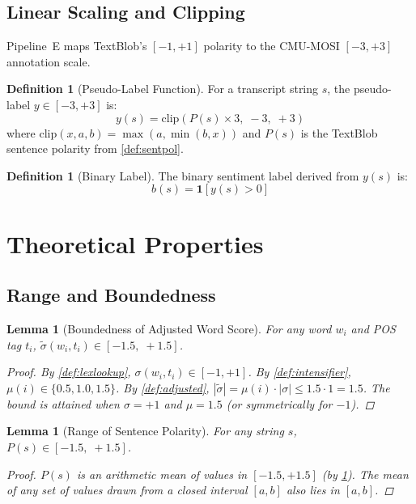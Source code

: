 \documentclass[12pt,a4paper]{article}
\theoremstyle{plain}
\newtheorem{lemma}[theorem]{Lemma}
\theoremstyle{definition}
\newtheorem{definition}[theorem]{Definition}
\begin{document}
\subsection{Linear Scaling and Clipping}

Pipeline~E maps TextBlob's $[-1,+1]$ polarity to the CMU-MOSI
$[-3,+3]$ annotation scale.

\begin{definition}[Pseudo-Label Function]
\label{def:pseudolabel}
  For a transcript string $s$, the pseudo-label $y \in [-3,+3]$ is:
  \[
    \boxed{y(s) = \text{clip}\!\left(P(s) \times 3,\; -3,\; +3\right)}
  \]
  where $\text{clip}(x, a, b) = \max(a, \min(b, x))$ and $P(s)$ is
  the TextBlob sentence polarity from \cref{def:sentpol}.
\end{definition}

\begin{definition}[Binary Label]
\label{def:binary}
  The binary sentiment label derived from $y(s)$ is:
  \[
    b(s) = \mathbf{1}[y(s) > 0]
  \]
\end{definition}

\section{Theoretical Properties}
\label{sec:theory}

\subsection{Range and Boundedness}

\begin{lemma}[Boundedness of Adjusted Word Score]
\label{lem:wordscore_bound}
  For any word $w_i$ and POS tag $t_i$,
  $\tilde{\sigma}(w_i, t_i) \in [-1.5,\; +1.5]$.
  \begin{proof}
    By \cref{def:lexlookup}, $\sigma(w_i, t_i) \in [-1, +1]$.
    By \cref{def:intensifier}, $\mu(i) \in \{0.5, 1.0, 1.5\}$.
    By \cref{def:adjusted}, $|\tilde{\sigma}| = \mu(i)\cdot|\sigma|
    \le 1.5 \cdot 1 = 1.5$.  The bound is attained when
    $\sigma = +1$ and $\mu = 1.5$ (or symmetrically for $-1$).
  \end{proof}
\end{lemma}

\begin{lemma}[Range of Sentence Polarity]
\label{lem:polarity_range}
  For any string $s$, $P(s) \in [-1.5,\; +1.5]$.
  \begin{proof}
    $P(s)$ is an arithmetic mean of values in $[-1.5, +1.5]$
    (by \cref{lem:wordscore_bound}).  The mean of any set of values
    drawn from a closed interval $[a,b]$ also lies in $[a,b]$.
  \end{proof}
\end{lemma}
\end{document}
